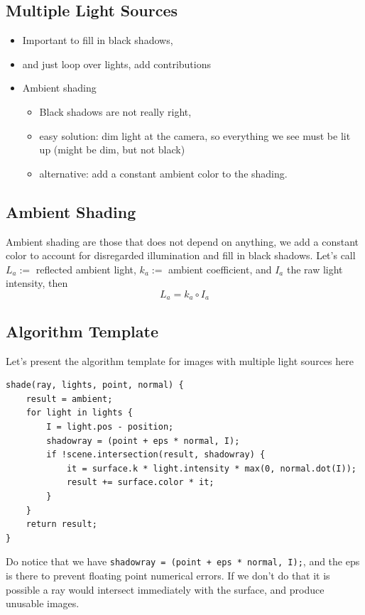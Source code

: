 \documentclass[11pt]{article}
\begin{document}
\subsection{Multiple Light Sources}
\begin{itemize}
	\item Important to fill in black shadows, 
	\item and just loop over lights, add contributions
	\item Ambient shading
	\begin{itemize}
		\item Black shadows are not really right, 
		\item easy solution: dim light at the camera, so everything we see must  be lit up (might be dim, but not black)
		\item alternative: add a constant ambient color to the shading. 
	\end{itemize}
\end{itemize}

\subsection{Ambient Shading}
Ambient shading are those that does not depend on anything, we add a constant color to account for disregarded illumination and fill in black shadows. Let's call $L_a:=$ reflected ambient light, $k_a:=$ ambient coefficient, and $I_a$ the raw light intensity, then
\begin{equation}
	L_a = k_a \circ I_a
\end{equation}

\subsection{Algorithm Template}
Let's present the algorithm template for images with multiple light sources here
\begin{mdframed}
	\begin{verbatim}
shade(ray, lights, point, normal) {
    result = ambient; 
    for light in lights {
        I = light.pos - position; 
        shadowray = (point + eps * normal, I); 
        if !scene.intersection(result, shadowray) {
            it = surface.k * light.intensity * max(0, normal.dot(I));
            result += surface.color * it;
        }
    }
    return result; 
}
	\end{verbatim}
\end{mdframed}
Do notice that we have \texttt{shadowray = (point + eps * normal, I);}, and the eps is there to prevent floating point numerical errors. If we don't do that it is possible a ray would intersect immediately with the surface, and produce unusable images. 
\end{document}
